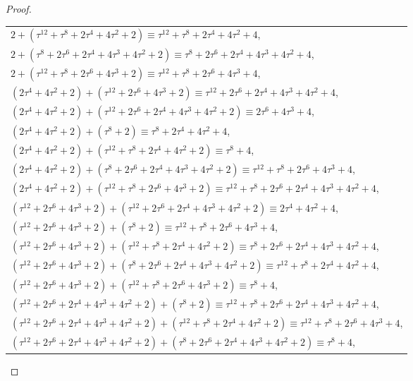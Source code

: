 \documentclass[12pt]{article}
\theoremstyle{remark}
\begin{document}
\begin{proof}
\begin{center}
\begin{tabular}{@{}l@{}}
    $2 + (\tau^{12}+\tau^8+2\tau^4+4\tau^2+2) \equiv \tau^{12}+\tau^8+2\tau^4+4\tau^2+4$, \\
    $2 + (\tau^8+2\tau^6+2\tau^4+4\tau^3+4\tau^2+2) \equiv \tau^{8}+2\tau^6+2\tau^4+4\tau^3+4\tau^2+4$,  \\
    $2 + (\tau^{12}+\tau^8+2\tau^6+4\tau^3+2) \equiv \tau^{12}+\tau^8+2\tau^6+4\tau^3+4$,\\
    $(2\tau^4+4\tau^2+2) + (\tau^{12}+2\tau^6+4\tau^3+2) \equiv \tau^{12} + 2\tau^6+2\tau^4+ 4\tau^3 +4\tau^2+ 4$, \\
    $(2\tau^4+4\tau^2+2) + (\tau^{12}+ 2\tau^6 + 2\tau^4 + 4\tau^3 + 4\tau^2 + 2) \equiv 2\tau^6 + 4\tau^3 + 4$, \\
    $(2\tau^4+4\tau^2+2) + (\tau^8 + 2) \equiv \tau^{8} + 2\tau^4 + 4\tau^2+4 $, \\
    $(2\tau^4+4\tau^2+2) + (\tau^{12}+\tau^8+2\tau^4+4\tau^2+2) \equiv \tau^{8}+4$, \\
    $(2\tau^4+4\tau^2+2) + (\tau^8+2\tau^6+2\tau^4+4\tau^3+4\tau^2+2) \equiv \tau^{12}+\tau^8+2\tau^6+4\tau^3+4$,  \\
    $(2\tau^4+4\tau^2+2) + (\tau^{12}+\tau^8+2\tau^6+4\tau^3+2) \equiv \tau^{12}+\tau^8+2\tau^6+2\tau^4+4\tau^3+4\tau^2+4$,\\ 
    $(\tau^{12}+2\tau^6+4\tau^3+2) + (\tau^{12}+ 2\tau^6 + 2\tau^4 + 4\tau^3 + 4\tau^2 + 2) \equiv 2\tau^4+4\tau^2+4$,\\
    $(\tau^{12}+2\tau^6+4\tau^3+2) + (\tau^8 + 2) \equiv \tau^{12}+\tau^8+2\tau^6+4\tau^3+4$,\\
    $(\tau^{12}+2\tau^6+4\tau^3+2) + (\tau^{12}+\tau^8+2\tau^4+4\tau^2+2) \equiv \tau^{8}+2\tau^6+2\tau^4+4\tau^3+4\tau^2+4$,\\
    $(\tau^{12}+2\tau^6+4\tau^3+2) + (\tau^8+2\tau^6+2\tau^4+4\tau^3+4\tau^2+2) \equiv \tau^{12}+\tau^8+2\tau^4+4\tau^2+4$,\\
    $(\tau^{12}+2\tau^6+4\tau^3+2) + (\tau^{12}+\tau^8+2\tau^6+4\tau^3+2) \equiv \tau^{8}+4$,\\
    $(\tau^{12}+ 2\tau^6 + 2\tau^4 + 4\tau^3 + 4\tau^2 + 2) + (\tau^8 + 2) \equiv  \tau^{12}+\tau^8+2\tau^6+2\tau^4 + 4\tau^3+4\tau^2+4 $,\\
    $(\tau^{12}+ 2\tau^6 + 2\tau^4 + 4\tau^3 + 4\tau^2 + 2) + (\tau^{12}+\tau^8+2\tau^4+4\tau^2+2) \equiv \tau^{12}+\tau^8+ 2\tau^6+4\tau^3+4$,\\
    $(\tau^{12}+ 2\tau^6 + 2\tau^4 + 4\tau^3 + 4\tau^2 + 2) + (\tau^8+2\tau^6+2\tau^4+4\tau^3+4\tau^2+2) \equiv \tau^{8}+4$,\\

\end{tabular}
\end{center}
\end{proof}
\end{document}
